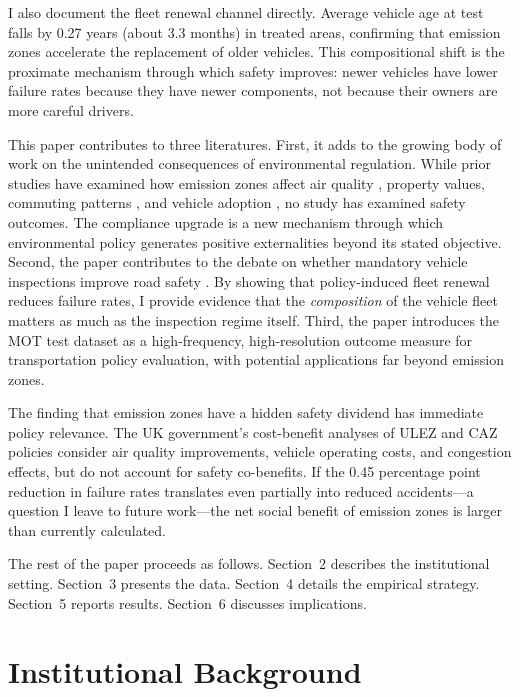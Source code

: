 \documentclass[12pt]{article}
\begin{document}
I also document the fleet renewal channel directly. Average vehicle age at test falls by 0.27 years (about 3.3 months) in treated areas, confirming that emission zones accelerate the replacement of older vehicles. This compositional shift is the proximate mechanism through which safety improves: newer vehicles have lower failure rates because they have newer components, not because their owners are more careful drivers.

This paper contributes to three literatures. First, it adds to the growing body of work on the unintended consequences of environmental regulation. While prior studies have examined how emission zones affect air quality \citep{gehrsitz2017, green2020, wolff2023}, property values, commuting patterns \citep{ellison2020}, and vehicle adoption \citep{wolff2014}, no study has examined safety outcomes. The compliance upgrade is a new mechanism through which environmental policy generates positive externalities beyond its stated objective. Second, the paper contributes to the debate on whether mandatory vehicle inspections improve road safety \citep{li2019, hollingsworth2022}. By showing that policy-induced fleet renewal reduces failure rates, I provide evidence that the \textit{composition} of the vehicle fleet matters as much as the inspection regime itself. Third, the paper introduces the MOT test dataset as a high-frequency, high-resolution outcome measure for transportation policy evaluation, with potential applications far beyond emission zones.

The finding that emission zones have a hidden safety dividend has immediate policy relevance. The UK government's cost-benefit analyses of ULEZ and CAZ policies consider air quality improvements, vehicle operating costs, and congestion effects, but do not account for safety co-benefits. If the 0.45 percentage point reduction in failure rates translates even partially into reduced accidents---a question I leave to future work---the net social benefit of emission zones is larger than currently calculated.

The rest of the paper proceeds as follows. Section~2 describes the institutional setting. Section~3 presents the data. Section~4 details the empirical strategy. Section~5 reports results. Section~6 discusses implications.


\section{Institutional Background}
\end{document}

